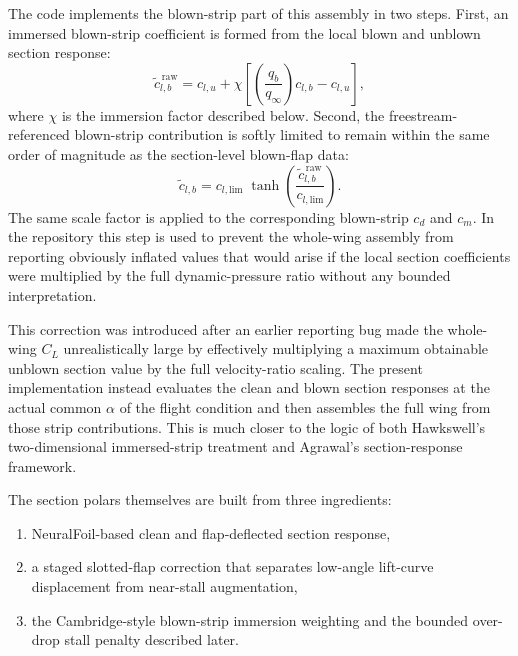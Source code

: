 \documentclass[conf]{new-aiaa}
\begin{document}
The code implements the blown-strip part of this assembly in two steps. First, an immersed blown-strip coefficient is formed from the local blown and unblown section response:
\begin{equation}
\tilde c_{l,b}^{\,\mathrm{raw}} =
c_{l,u} +
\chi\left[\left(\frac{q_b}{q_\infty}\right)c_{l,b} - c_{l,u}\right],
\end{equation}
where \(\chi\) is the immersion factor described below. Second, the freestream-referenced blown-strip contribution is softly limited to remain within the same order of magnitude as the section-level blown-flap data:
\begin{equation}
\tilde c_{l,b} =
c_{l,\mathrm{lim}}\;
\tanh\!\left(\frac{\tilde c_{l,b}^{\,\mathrm{raw}}}{c_{l,\mathrm{lim}}}\right).
\end{equation}
The same scale factor is applied to the corresponding blown-strip \(c_d\) and \(c_m\). In the repository this step is used to prevent the whole-wing assembly from reporting obviously inflated values that would arise if the local section coefficients were multiplied by the full dynamic-pressure ratio without any bounded interpretation.

This correction was introduced after an earlier reporting bug made the whole-wing \(C_L\) unrealistically large by effectively multiplying a maximum obtainable unblown section value by the full velocity-ratio scaling. The present implementation instead evaluates the clean and blown section responses at the actual common \(\alpha\) of the flight condition and then assembles the full wing from those strip contributions. This is much closer to the logic of both Hawkswell's two-dimensional immersed-strip treatment and Agrawal's section-response framework.\cite{Hawkswell2022,Agrawal2019}

The section polars themselves are built from three ingredients:
\begin{enumerate}
\item NeuralFoil-based clean and flap-deflected section response,
\item a staged slotted-flap correction that separates low-angle lift-curve displacement from near-stall augmentation,
\item the Cambridge-style blown-strip immersion weighting and the bounded over-drop stall penalty described later.
\end{enumerate}
\end{document}

